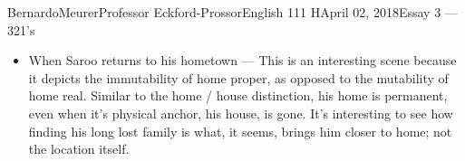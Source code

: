 \documentclass[12pt,letterpaper]{article}
\begin{document}
\begin{mla}{Bernardo}{Meurer}{Professor Eckford-Prossor}{English 111 H}{April 02, 2018}{Essay 3 --- 321's}
\begin{itemize}
		      In another of his poems, ``Deslumbramentos'' or `Dazzles'' (Note that I do not believe that ``Dazzle'' is a fair translation of the Portuguese original, but after much thought I have failed to come up with any better alternative, and therefore will use ``Dazzles'') he explores the dangers of contemplating an unattainable love.
		      I'm not sure where to go with this, but I feel like with some more thought I might be able to connect this to how we understand who we are, or at least with the ``cognitive dissonance'' of the city. Also, this point makes me think of Chopin's Preludes, not entirely sure how to relate it rigorously yet.
		\item When Saroo returns to his hometown --- This is an interesting scene because it depicts the immutability of home proper, as opposed to the mutability of home real. Similar to the home / house distinction, his home is permanent, even when it's physical anchor, his house, is gone. It's interesting to see how finding his long lost family is what, it seems, brings him closer to home; not the location itself.
	\end{itemize}
	\newpage

\end{mla}
\end{document}
